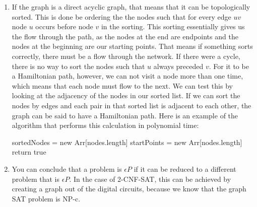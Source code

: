\documentclass{article}
\begin{document}
\begin{enumerate}
\item
    If the graph is a direct acyclic graph, that means that it can be topologically sorted. This is done be ordering the the nodes such that for every edge \(uv\) node \(u\) occurs before node \(v\) in the sorting. This sorting essentially gives us the flow through the path, as the nodes at the end are endpoints and the nodes at the beginning are our starting points. That means if something sorts correctly, there must be a flow through the network. If there were a cycle, there is no way to sort the nodes such that \(u\) always preceded \(v\). For it to be a Hamiltonian path, however, we can not visit a node more than one time, which means that each node must flow to the next. We can test this by looking at the adjacency of the nodes in our sorted list. If we can sort the nodes by edges and each pair in that sorted list is adjacent to each other, the graph can be said to have a Hamiltonian path. Here is an example of the algorithm that performs this calculation in polynomial time:
    
    \hspace*{.5em}\begin{minipage}{.99\linewidth}
        \begin{algorithm}[H]
            \SetAlgoLined
            \BlankLine
            sortedNodes = new Arr[nodes.length]\;
            startPoints = new Arr[nodes.length]\;
            \BlankLine
            return true
        \end{algorithm}
    \end{minipage}
\pagebreak
\item
    You can conclude that a problem is \(\epsilon P\) if it can be reduced to a different problem that is \(\epsilon P\). In the case of 2-CNF-SAT, this can be achieved by creating a graph out of the digital circuits, because we know that the graph SAT problem is NP-c.
    

\end{enumerate}
\end{document}
